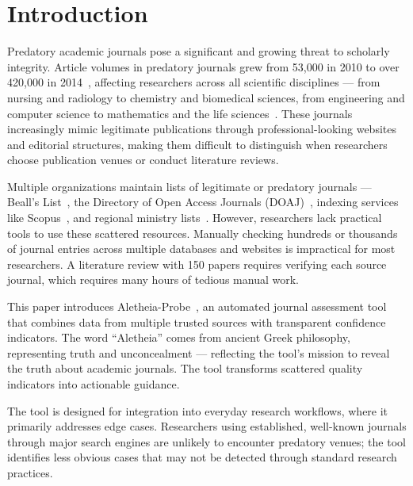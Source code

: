 \documentclass[fleqn,10pt]{SelfArx}
\affiliation{\textsuperscript{1}\textit{Deutsche Telekom AG, Andreas.Florath@telekom.de}}
\begin{document}
\maketitle

\tableofcontents 

\section{Introduction}
Predatory academic journals pose a significant and growing threat to
scholarly integrity. Article volumes in predatory journals grew from
53,000 in 2010 to over 420,000 in 2014~\cite{shen2015predatory},
affecting researchers across all scientific disciplines --- from
nursing and radiology to chemistry and biomedical sciences, from
engineering and computer science to mathematics and the life
sciences~\cite{gabrielsson2020nursing,aribal2020radiology,Sevryugina2023,Sharma2018,agricola2025}. These
journals increasingly mimic legitimate publications through
professional-looking websites and editorial structures, making them
difficult to distinguish when researchers choose publication venues or
conduct literature reviews.

Multiple organizations maintain lists of legitimate or predatory
journals --- Beall's List~\cite{bealls_list}, the Directory of Open
Access Journals (DOAJ)~\cite{doaj}, indexing services like
Scopus~\cite{scopus}, and regional ministry
lists~\cite{DGRSDT2024}. However, researchers lack practical tools to
use these scattered resources. Manually checking hundreds or thousands
of journal entries across multiple databases and websites is impractical
for most researchers. A literature review with 150 papers requires
verifying each source journal, which requires many hours of tedious
manual work.

This paper introduces Aletheia-Probe~\cite{aletheia_probe}, an
automated journal assessment tool that combines data from multiple
trusted sources with transparent confidence indicators. The word
``Aletheia'' comes from ancient Greek philosophy, representing truth
and unconcealment --- reflecting the tool's mission to reveal the
truth about academic journals. The tool transforms scattered quality
indicators into actionable guidance.

The tool is designed for integration into everyday research workflows,
where it primarily addresses edge cases. Researchers using established,
well-known journals through major search engines are unlikely to
encounter predatory venues; the tool identifies less obvious cases that
may not be detected through standard research practices.
\end{document}
